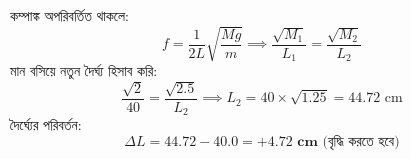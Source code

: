 \documentclass[12pt, a4paper]{article}
\begin{document}
\begin{tcolorbox}[solutionbox={সমাধান (Solution)}]
    \noindent
    কম্পাঙ্ক অপরিবর্তিত থাকলে:
    \[ f = \frac{1}{2L}\sqrt{\frac{Mg}{m}} \implies \frac{\sqrt{M_1}}{L_1} = \frac{\sqrt{M_2}}{L_2} \]
    মান বসিয়ে নতুন দৈর্ঘ্য হিসাব করি:
    \[ \frac{\sqrt{2}}{40} = \frac{\sqrt{2.5}}{L_2} \implies L_2 = 40 \times \sqrt{1.25} = 44.72\text{ cm} \]
    দৈর্ঘ্যের পরিবর্তন:
    \[ \Delta L = 44.72 - 40.0 = \mathbf{+4.72\text{ cm}} \text{ (বৃদ্ধি করতে হবে)} \]
\end{tcolorbox}
\end{document}
